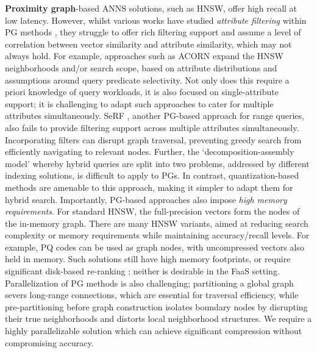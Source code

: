 \textbf{Proximity graph}-based ANNS solutions, such as HNSW, offer high recall at low latency. However, whilst various works have studied \textit{attribute filtering} within PG methods \cite{Gollapudi2023FilteredDiskANN, Patel2024ACORN, wang2022navigableproximitygraphdrivennative-NHQ-2, NEURIPS2023-Wang-NHQ, zhao2022constrainedapproximatesimilaritysearchAIRSHIP}, they struggle to offer rich filtering support and assume a level of correlation between vector similarity and attribute similarity, which may not always hold. For example, approaches such as ACORN \cite{Patel2024ACORN} expand the HNSW neighborhoods and/or search scope, based on attribute distributions and assumptions around query predicate selectivity. Not only does this require a priori knowledge of query workloads, it is also focused on single-attribute support; it is challenging to adapt such approaches to cater for multiple attributes simultaneously. SeRF \cite{SeRF2024}, another PG-based approach for range queries, also fails to provide filtering support across multiple attributes simultaneously. 
Incorporating filters can disrupt graph traversal, preventing greedy search from efficiently navigating to relevant nodes.
Further, the ‘decomposition-assembly model’ \cite{NEURIPS2023-Wang-NHQ} whereby hybrid queries are split into two problems, addressed by different indexing solutions, is difficult to apply to PGs. 
In contrast, quantization-based methods are amenable to this approach, making it simpler to adapt them for hybrid search.
Importantly, PG-based approaches also impose \textit{high memory requirements}. For standard HNSW, the full-precision vectors form the nodes of the in-memory graph. 
There are many HNSW variants, aimed at reducing search complexity or memory requirements while maintaining accuracy/recall levels. 
For example, PQ codes can be used as graph nodes, with uncompressed vectors also held in memory.
Such solutions still have high memory footprints, or require significant disk-based re-ranking \cite{FaissMissingManual}; neither is desirable in the FaaS setting. 
Parallelization of PG methods is also challenging; partitioning a global graph severs long-range connections, which are essential for traversal efficiency, while pre-partitioning before graph construction isolates boundary nodes by disrupting their true neighborhoods and distorts local neighborhood structures.
We require a highly parallelizable solution which can achieve significant compression without compromising accuracy.



